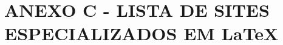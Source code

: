 \renewcommand{\thechapter}{}
\chapter{ANEXO C - LISTA DE SITES ESPECIALIZADOS EM \LaTeX{}}
\label{anexoC}
\renewcommand{\thechapter}{C}
